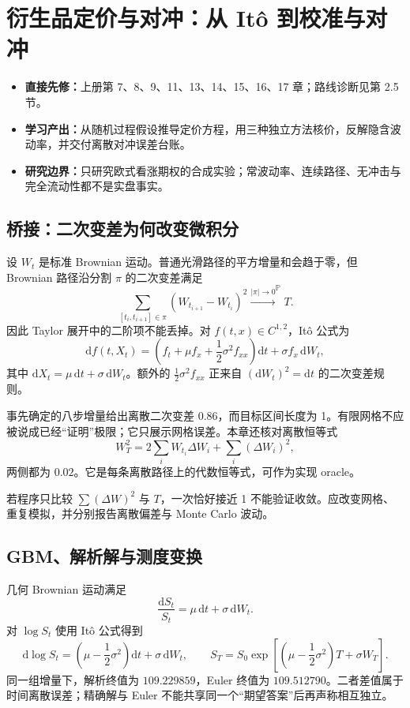 \chapter{衍生品定价与对冲：从 Itô 到校准与对冲}

\begin{itemize}
  \item \textbf{直接先修：}上册第 7、8、9、11、13、14、15、16、17 章；路线诊断见第 2.5 节。
  \item \textbf{学习产出：}从随机过程假设推导定价方程，用三种独立方法核价，反解隐含波动率，并交付离散对冲误差台账。
  \item \textbf{研究边界：}只研究欧式看涨期权的合成实验；常波动率、连续路径、无冲击与完全流动性都不是实盘事实。
\end{itemize}

\section{桥接：二次变差为何改变微积分}

设 $W_t$ 是标准 Brownian 运动。普通光滑路径的平方增量和会趋于零，但 Brownian 路径沿分割 $\pi$ 的二次变差满足
\[
  \sum_{[t_i,t_{i+1}]\in\pi}(W_{t_{i+1}}-W_{t_i})^2
  \xrightarrow{|\pi|\to0}^{\mathbb P}T.
\]
因此 Taylor 展开中的二阶项不能丢掉。对 $f(t,x)\in C^{1,2}$，Itô 公式为
\[
 \mathrm df(t,X_t)=
 \left(f_t+\mu f_x+\frac12\sigma^2f_{xx}\right)\mathrm dt
 +\sigma f_x\,\mathrm dW_t,
\]
其中 $\mathrm dX_t=\mu\,\mathrm dt+\sigma\,\mathrm dW_t$。额外的 $\tfrac12\sigma^2f_{xx}$ 正来自 $(\mathrm dW_t)^2=\mathrm dt$ 的二次变差规则。

事先确定的八步增量给出离散二次变差 $0.86$，而目标区间长度为 1。有限网格不应被说成已经“证明”极限；它只展示网格误差。本章还核对离散恒等式
\[
 W_T^2=2\sum_i W_{t_i}\Delta W_i+\sum_i(\Delta W_i)^2,
\]
两侧都为 $0.02$。它是每条离散路径上的代数恒等式，可作为实现 oracle。

\begin{diagnostic}
若程序只比较 $\sum(\Delta W)^2$ 与 $T$，一次恰好接近 1 不能验证收敛。应改变网格、重复模拟，并分别报告离散偏差与 Monte Carlo 波动。
\end{diagnostic}

\section{GBM、解析解与测度变换}

几何 Brownian 运动满足
\[
 \frac{\mathrm dS_t}{S_t}=\mu\,\mathrm dt+\sigma\,\mathrm dW_t.
\]
对 $\log S_t$ 使用 Itô 公式得到
\[
 \mathrm d\log S_t=\left(\mu-\frac12\sigma^2\right)\mathrm dt+\sigma\,\mathrm dW_t,
\qquad
 S_T=S_0\exp\!\left[\left(\mu-\frac12\sigma^2\right)T+\sigma W_T\right].
\]
同一组增量下，解析终值为 $109.229859$，Euler 终值为 $109.512790$。二者差值属于时间离散误差；精确解与 Euler 不能共享同一个“期望答案”后再声称相互独立。

